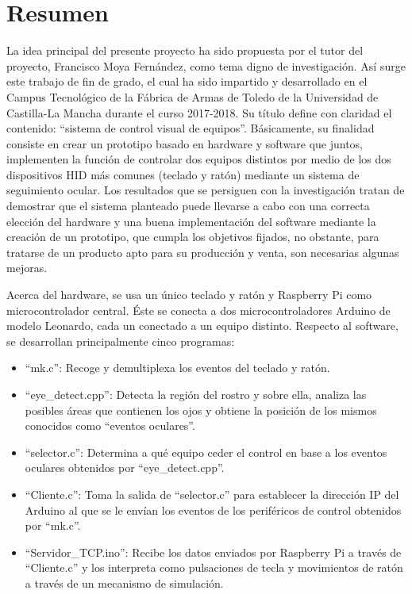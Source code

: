 %
\chapter*{Resumen} \label{resumen}
\pagestyle{empty}
\thispagestyle{empty} 

La idea principal del presente proyecto ha sido propuesta por el tutor del proyecto, Francisco Moya Fernández, como tema digno de investigación. Así surge este trabajo de fin de grado, el cual ha sido impartido y desarrollado en el Campus Tecnológico de la Fábrica de Armas de Toledo de la Universidad de Castilla-La Mancha durante el curso 2017-2018. Su título define con claridad el contenido: ``sistema de control visual de equipos''. Básicamente, su finalidad consiste en crear un prototipo basado en hardware y software que juntos, implementen la función de controlar dos equipos distintos por medio de los dos dispositivos HID más comunes (teclado y ratón) mediante un sistema de seguimiento ocular. Los resultados que se persiguen con la investigación tratan de demostrar que el sistema planteado puede llevarse a cabo con una correcta elección del hardware y una buena implementación del software mediante la creación de un prototipo, que cumpla los objetivos fijados, no obstante, para tratarse de un producto apto para su producción y venta, son necesarias algunas mejoras.

Acerca del hardware, se usa un único teclado y ratón y Raspberry Pi como microcontrolador central. Éste se conecta a dos microcontroladores Arduino de modelo Leonardo, cada un conectado a un equipo distinto. Respecto al software, se desarrollan principalmente cinco programas:
\begin{itemize}
    \item ``mk.c'': Recoge y demultiplexa los eventos del teclado y ratón.
    \item ``eye\_detect.cpp'': Detecta la región del rostro y sobre ella, analiza las posibles áreas que contienen los ojos y obtiene la posición de los mismos conocidos como ``eventos oculares''.
    \item ``selector.c'': Determina a qué equipo ceder el control en base a los eventos oculares obtenidos por ``eye\_detect.cpp''.
    \item ``Cliente.c'': Toma la salida de ``selector.c'' para establecer la dirección IP del Arduino al que se le envían los eventos de los periféricos de control obtenidos por ``mk.c''.
    \item ``Servidor\_TCP.ino'': Recibe los datos enviados por Raspberry Pi a través de ``Cliente.c'' y los interpreta como pulsaciones de tecla y movimientos de ratón a través de un mecanismo de simulación.
\end{itemize}

